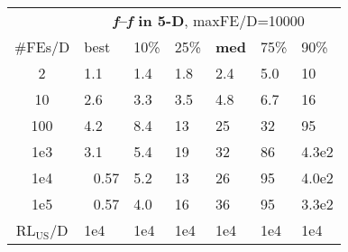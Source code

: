 \begin{tabular}{c|llllll}
 & \multicolumn{6}{|c}{\textbf{\textit{f}\raisebox{-0.35ex}{1}--\textit{f}\raisebox{-0.35ex}{24} in 5-D}, maxFE/D=10000}\\
\#FEs/D & best & 10\% & 25\% & \textbf{med} & 75\% & 90\%\\
2 & \hspace*{1ex}1.1 & \hspace*{1ex}1.4 & \hspace*{1ex}1.8 & \hspace*{1ex}2.4 & \hspace*{1ex}5.0 & 10\\
10 & \hspace*{1ex}2.6 & \hspace*{1ex}3.3 & \hspace*{1ex}3.5 & \hspace*{1ex}4.8 & \hspace*{1ex}6.7 & 16\\
100 & \hspace*{1ex}4.2 & \hspace*{1ex}8.4 & 13 & 25 & 32 & 95\\
1e3 & \hspace*{1ex}3.1 & \hspace*{1ex}5.4 & 19 & 32 & 86 & 4.3e2\\
1e4 & ~\,0.57 & \hspace*{1ex}5.2 & 13 & 26 & 95 & 4.0e2\\
1e5 & ~\,0.57 & \hspace*{1ex}4.0 & 16 & 36 & 95 & 3.3e2\\
$\text{RL}_{\text{US}}$/D & 1e4 & 1e4 & 1e4 & 1e4 & 1e4 & 1e4
\end{tabular}
